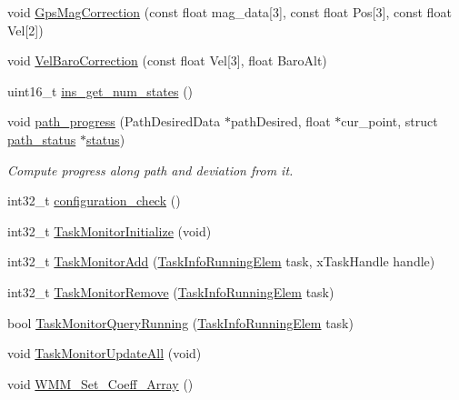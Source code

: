 \begin{DoxyCompactItemize}
\item 
void \hyperlink{group___tau_labs_libraries_ga7f60c28dd78eddbe08102c2d905261b8}{\-Gps\-Mag\-Correction} (const float mag\-\_\-data\mbox{[}3\mbox{]}, const float \-Pos\mbox{[}3\mbox{]}, const float \-Vel\mbox{[}2\mbox{]})
\item 
void \hyperlink{group___tau_labs_libraries_ga3babc960a16e4ab48bf08da4a9153637}{\-Vel\-Baro\-Correction} (const float \-Vel\mbox{[}3\mbox{]}, float \-Baro\-Alt)
\item 
uint16\-\_\-t \hyperlink{group___tau_labs_libraries_ga62f40f528dea50baf8d414d1f55469af}{ins\-\_\-get\-\_\-num\-\_\-states} ()
\item 
void \hyperlink{group___tau_labs_libraries_ga6ed4a1bcd07bbebd69b701dfdc42f36e}{path\-\_\-progress} (\-Path\-Desired\-Data $\ast$path\-Desired, float $\ast$cur\-\_\-point, struct \hyperlink{structpath__status}{path\-\_\-status} $\ast$\hyperlink{group___sparky_b_l_ga2414697de79a243562514a0a4344a4dd}{status})
\begin{DoxyCompactList}\small\item\em \-Compute progress along path and deviation from it. \end{DoxyCompactList}\item 
int32\-\_\-t \hyperlink{group___tau_labs_libraries_gabcb80832a82e492c119a231984eba10a}{configuration\-\_\-check} ()
\item 
int32\-\_\-t \hyperlink{group___tau_labs_libraries_ga1d9cdd0b4255485c84d4a695a4a9ae0f}{\-Task\-Monitor\-Initialize} (void)
\item 
int32\-\_\-t \hyperlink{group___tau_labs_libraries_ga092c2aa7f99dfb3f394bf3b086f6ef45}{\-Task\-Monitor\-Add} (\hyperlink{group___task_info_ga772847398b4ab66cab9a93abec0b55b7}{\-Task\-Info\-Running\-Elem} task, x\-Task\-Handle handle)
\item 
int32\-\_\-t \hyperlink{group___tau_labs_libraries_ga6c09782e470b26f4506a57ada8037664}{\-Task\-Monitor\-Remove} (\hyperlink{group___task_info_ga772847398b4ab66cab9a93abec0b55b7}{\-Task\-Info\-Running\-Elem} task)
\item 
bool \hyperlink{group___tau_labs_libraries_ga2212575f7dbf4b2452fb7baa81b48115}{\-Task\-Monitor\-Query\-Running} (\hyperlink{group___task_info_ga772847398b4ab66cab9a93abec0b55b7}{\-Task\-Info\-Running\-Elem} task)
\item 
void \hyperlink{group___tau_labs_libraries_ga35c7698b89cc04a2fce87ed36b155fc0}{\-Task\-Monitor\-Update\-All} (void)
\item 
void \hyperlink{group___tau_labs_libraries_ga68979926a219736185f88ac574dc60a2}{\-W\-M\-M\-\_\-\-Set\-\_\-\-Coeff\-\_\-\-Array} ()

\end{DoxyCompactItemize}
